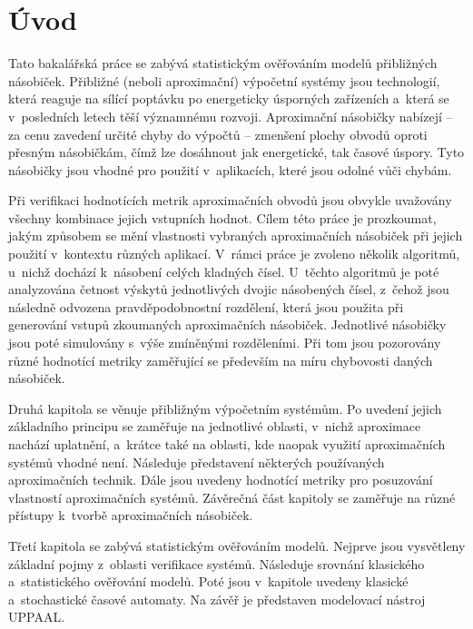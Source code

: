 
%

\chapter{Úvod}
Tato bakalářská práce se zabývá statistickým ověřováním modelů přibližných násobiček. Přibližné (neboli aproximační) výpočetní systémy jsou technologií, která reaguje na sílící poptávku po energeticky úsporných zařízeních a~která se v~posledních letech těší významnému rozvoji. Aproximační násobičky nabízejí -- za cenu zavedení určité chyby do výpočtů -- zmenšení plochy obvodů oproti přesným násobičkám, čímž lze dosáhnout jak energetické, tak časové úspory. Tyto násobičky jsou vhodné pro použití v~aplikacích, které jsou odolné vůči chybám.

Při verifikaci hodnotících metrik aproximačních obvodů jsou obvykle uvažovány všechny kombinace jejich vstupních hodnot. Cílem této práce je prozkoumat, jakým způsobem se mění vlastnosti vybraných aproximačních násobiček při jejich použití v~kontextu různých aplikací. V~rámci práce je zvoleno několik algoritmů, u~nichž dochází k~násobení celých kladných čísel. U~těchto algoritmů je poté analyzována četnost výskytů jednotlivých dvojic násobených čísel, z~čehož jsou následně odvozena pravděpodobnostní rozdělení, která jsou použita při generování vstupů zkoumaných aproximačních násobiček. Jednotlivé násobičky jsou poté simulovány s~výše zmíněnými rozděleními. Při tom jsou pozorovány různé hodnotící metriky zaměřující se především na míru chybovosti daných násobiček.

Druhá kapitola se věnuje přibližným výpočetním systémům. Po uvedení jejich základního principu se zaměřuje na jednotlivé oblasti, v~nichž aproximace nachází uplatnění, a~krátce také na oblasti, kde naopak využití aproximačních systémů vhodné není. Následuje představení některých používaných aproximačních technik. Dále jsou uvedeny hodnotící metriky pro posuzování vlastností aproximačních systémů. Závěrečná část kapitoly se zaměřuje na různé přístupy k~tvorbě aproximačních násobiček.

Třetí kapitola se zabývá statistickým ověřováním modelů. Nejprve jsou vysvětleny základní pojmy z~oblasti verifikace systémů. Následuje srovnání klasického a~statistického ověřování modelů. Poté jsou v~kapitole uvedeny klasické a~stochastické časové automaty. Na závěř je představen modelovací nástroj UPPAAL.

